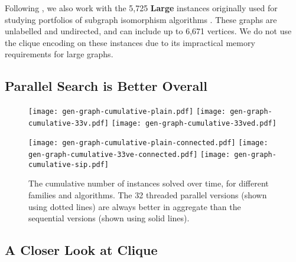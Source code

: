 \documentclass[sigconf]{acmart}
\begin{document}
\noindent
Following \citet{DBLP:conf/aaai/HoffmannMR17}, we also work with the 5,725 \textbf{Large} instances
originally used for studying portfolios of subgraph isomorphism algorithms
\citep{DBLP:conf/lion/KotthoffMS16}. These graphs are unlabelled and undirected, and can include up
to 6,671 vertices. We do not use the clique encoding on these instances due to its impractical
memory requirements for large graphs.

\subsection{Parallel Search is Better Overall}

\begin{figure*}[tb]
    \texttt{[image: gen-graph-cumulative-plain.pdf]}
    \hfill
    \texttt{[image: gen-graph-cumulative-33v.pdf]}
    \hfill
    \texttt{[image: gen-graph-cumulative-33ved.pdf]}

    \vspace*{1em}

    \texttt{[image: gen-graph-cumulative-plain-connected.pdf]}
    \hfill
    \texttt{[image: gen-graph-cumulative-33ve-connected.pdf]}
    \hfill
    \texttt{[image: gen-graph-cumulative-sip.pdf]}

    \caption{The cumulative number of instances solved over time, for different families and
    algorithms. The 32 threaded parallel versions (shown using dotted lines) are always better in
    aggregate than the sequential versions (shown using solid lines).}
\end{figure*}

\subsection{A Closer Look at Clique}
\end{document}
